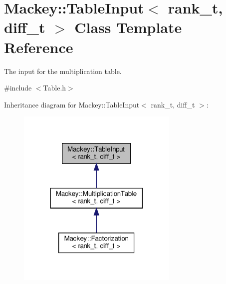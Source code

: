 \hypertarget{classMackey_1_1TableInput}{}\section{Mackey\+:\+:Table\+Input$<$ rank\+\_\+t, diff\+\_\+t $>$ Class Template Reference}
\label{classMackey_1_1TableInput}


The input for the multiplication table.  




{\ttfamily \#include $<$Table.\+h$>$}



Inheritance diagram for Mackey\+:\+:Table\+Input$<$ rank\+\_\+t, diff\+\_\+t $>$\+:\nopagebreak
\begin{figure}[H]
\begin{center}
\leavevmode
\includegraphics[width=218pt]{classMackey_1_1TableInput__inherit__graph}
\end{center}
\end{figure}
